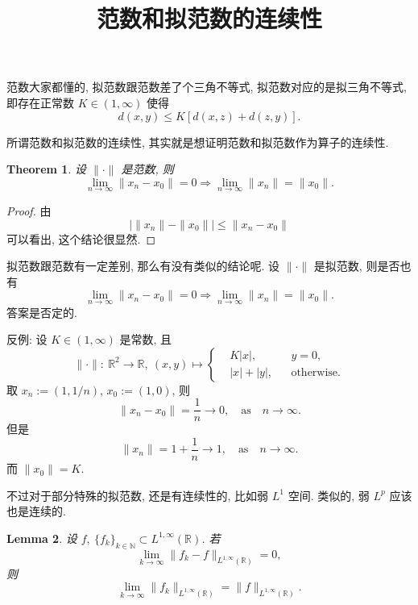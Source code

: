 \documentclass[a4paper,11pt]{article}
\title{范数和拟范数的连续性}
\newtheorem{theorem}{Theorem}[section]
\newtheorem{lemma}[theorem]{Lemma}
\theoremstyle{definition}
\begin{document}
\maketitle

范数大家都懂的, 拟范数跟范数差了个三角不等式, 拟范数对应的是拟三角不等式, 即存在正常数 $ K \in (1, \infty) $ 使得
$$
    d(x, y) \leq K[d(x, z) + d(z, y)].
$$

所谓范数和拟范数的连续性, 其实就是想证明范数和拟范数作为算子的连续性.

\begin{theorem}
    设 $ \| \cdot \| $ 是范数, 则
    $$
        \lim_{n \to \infty} \| x_n - x_0 \| = 0 
            \Longrightarrow \lim_{n \to \infty} \| x_n \| = \| x_0 \|.
    $$
\end{theorem}

\begin{proof}
    由
    $$ 
        \left| \| x_n \| - \| x_0 \| \right| \leq  \| x_n - x_0 \|
    $$
    可以看出, 这个结论很显然.
\end{proof}

拟范数跟范数有一定差别, 那么有没有类似的结论呢.
设 $ \| \cdot \| $ 是拟范数, 则是否也有
$$
    \lim_{n \to \infty} \| x_n - x_0 \| = 0 
        \Longrightarrow \lim_{n \to \infty} \| x_n \| = \| x_0 \|.
$$
答案是否定的.

反例: 设 $ K \in (1, \infty) $ 是常数, 且
$$ 
    \| \cdot \| :\ \mathbb{R}^2 \to \mathbb{R},\
        (x, y) \mapsto \left\{\begin{aligned}
        & K|x|,       && y = 0, \\
        & |x| + |y|,  && \text{otherwise}.
        \end{aligned}\right.
$$
取 $ x_n := (1, 1/n) $, $ x_0 := (1, 0) $, 则
$$
    \| x_n - x_0 \| = \frac{1}{n} \to 0, \quad \text{as} \quad n \to \infty.
$$
但是
$$
    \| x_n \| = 1 + \frac{1}{n} \to 1, \quad \text{as} \quad n \to \infty.
$$
而 $ \|x_0\| = K $.

不过对于部分特殊的拟范数, 还是有连续性的, 比如弱 $ L^1 $ 空间. 类似的, 弱 $ L^p $ 应该也是连续的.

\begin{lemma} \label{weak}
    设 $ f,\ \{f_k\}_{k \in \mathbb{N}} \subset L^{1, \infty}(\mathbb{R}) $.
    若
    $$
        \lim_{k \to \infty} \| f_k - f \|_{L^{1, \infty}(\mathbb{R})} = 0,
    $$
    则
    $$
        \lim_{k \to \infty} \| f_k \|_{L^{1, \infty}(\mathbb{R})}
            = \| f \|_{L^{1, \infty}(\mathbb{R})}.
    $$
\end{lemma}
\end{document}
